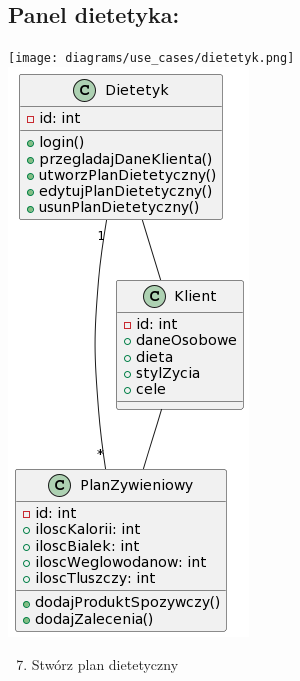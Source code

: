 \documentclass[
]{article}
\providecommand{\tightlist}{%
  \setlength{\itemsep}{0pt}\setlength{\parskip}{0pt}}
\begin{document}
\hypertarget{h.ks35fdzbeyq3}{%
\subsection{\texorpdfstring{{Panel
dietetyka:}}{Panel dietetyka:}}\label{h.ks35fdzbeyq3}}

{\texttt{[image: diagrams/use\_cases/dietetyk.png]}}
{\includegraphics{diagrams/class/dietetyk.png}}

\begin{enumerate}
\setcounter{enumi}{6}
\tightlist
\item
  {Stwórz plan dietetyczny}
\end{enumerate}
\end{document}
